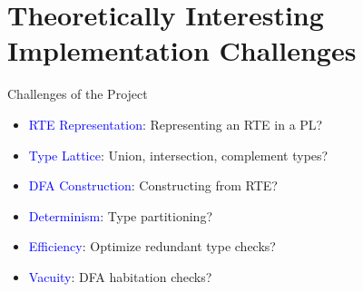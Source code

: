 \section{Theoretically Interesting Implementation Challenges}

{  %
\begin{frame}{Challenges of the Project}
  \begin{itemize}
  \item {} \textcolor{blue}{RTE Representation}:   Representing an RTE in a PL?
  \item {} \textcolor{blue}{Type Lattice}: Union, intersection, complement types?
  \item {} \textcolor{blue}{DFA Construction}:  Constructing from RTE?
  \item {} \textcolor{blue}{Determinism}: Type partitioning?
  \item {} \textcolor{blue}{Efficiency}: Optimize redundant type checks?
  \item {} \textcolor{blue}{Vacuity}: DFA habitation checks?
  \end{itemize}
\end{frame}
}


